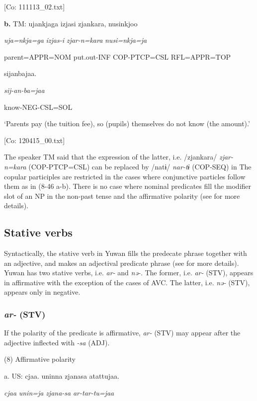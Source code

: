       [Co: 111113\_02.txt]

  \textbf{b.}  TM:  ujankjaga  izjasi  zjankara,  nusinkjoo

      \textit{uja=nkja=ga}  \textit{izjas-i}  \textit{zjar-n=kara}  \textit{nusi=nkja=ja}

      parent=APPR=NOM  put.out-INF  COP-PTCP=CSL  RFL=APPR=TOP

      sijanbajaa.

      \textit{sij-an-ba=jaa}

      know-NEG-CSL=SOL

      ‘Parents pay (the tuition fee), so (pupils) themselves do not know (the amount).’

      [Co: 120415\_00.txt]

The speaker TM said that the expression of the latter, i.e. /zjankara/ \textit{zjar-n=kara} (COP-PTCP=CSL) can be replaced by /natɨ/ \textit{nar-tɨ} (COP-SEQ) in  The copular participles are restricted in the cases where conjunctive particles follow them as in (8-46 a-b). There is no case where nominal predicates fill the modifier slot of an NP in the non-past tense and the affirmative polarity (see  for more details).

\subsection{Stative verbs}

Syntactically, the stative verb in Yuwan fills the predecate phrase together with an adjective, and makes an adjectival predicate phrase (see  for more details). Yuwan has two stative verbs, i.e. \textit{ar-} and \textit{nə-}. The former, i.e. \textit{ar-} (STV), appears in affirmative with the exception of the cases of AVC. The latter, i.e. \textit{nə-} (STV), appears only in negative.

\subsubsection{\textit{ar-} (STV)}

If the polarity of the predicate is affirmative, \textit{ar-} (STV) may appear after the adjective inflected with \textit{{}-sa} (ADJ).

(8)  Affirmative polarity

  a.  US:  cjaa.  uninna  zjanasa  atattujaa.

      \textit{cjaa}  \textit{unin=ja}  \textit{zjana-sa}  \textit{ar{}-tar-tu=jaa}

